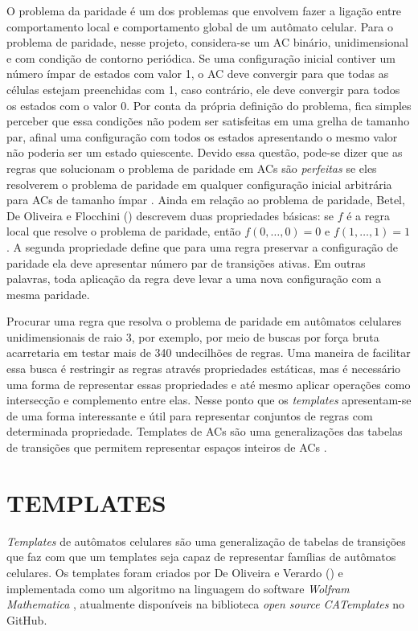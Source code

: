 \documentclass[12pt,a4paper]{article}
\let\stdsection\section
\renewcommand\section{\newpage\stdsection}
\begin{document}
O problema da paridade é um dos problemas que envolvem fazer a ligação entre comportamento local e comportamento global de um autômato celular. Para o problema de paridade, nesse projeto, considera-se um AC binário, unidimensional e com condição de contorno periódica. Se uma configuração inicial contiver um número ímpar de estados com valor 1, o AC deve convergir para que todas as células estejam preenchidas com 1, caso contrário, ele deve convergir para todos os estados com o valor 0. Por conta da própria definição do problema, fica simples perceber que essa condições não podem ser satisfeitas em uma grelha de tamanho par, afinal uma configuração com todos os estados apresentando o mesmo valor não poderia ser um estado quiescente. Devido essa questão, pode-se dizer que as regras que solucionam o problema de paridade em ACs são \textit{perfeitas} se eles resolverem o problema de paridade em qualquer configuração inicial arbitrária para ACs de tamanho ímpar \cite{Betel2013}. Ainda em relação ao problema de paridade, Betel, De Oliveira e Flocchini (\citeyear{Betel2013}) descrevem duas propriedades básicas: se $f$ é a regra local que resolve o problema de paridade, então $f(0, \dots, 0) = 0$ e $f(1, \dots, 1) = 1$. A segunda propriedade define que para uma regra preservar a configuração de paridade ela deve apresentar número par de transições ativas. Em outras palavras, toda aplicação da regra deve levar a uma nova configuração com a mesma paridade.

Procurar uma regra que resolva o problema de paridade em autômatos celulares unidimensionais de raio 3, por exemplo, por meio de buscas por força bruta acarretaria em testar mais de 340 undecilhões de regras. Uma maneira de facilitar essa busca é restringir as regras através propriedades estáticas, mas é necessário uma forma de representar essas propriedades e até mesmo aplicar operações como intersecção e complemento entre elas. Nesse ponto que os \textit{templates} apresentam-se de uma forma interessante e útil para representar conjuntos de regras com determinada propriedade. Templates de ACs são uma generalizações das tabelas de transições que permitem representar espaços inteiros de ACs \cite{Verardo2014}.








\section{TEMPLATES}\label{sec:templates}
\textit{Templates} de autômatos celulares são uma generalização de tabelas de transições que faz com que um templates seja capaz de representar famílias de autômatos celulares. Os templates foram criados por De Oliveira e Verardo (\citeyear{deOliveira2014}) e implementada como um algoritmo na linguagem do software \textit{Wolfram Mathematica} \cite{woframMathematica10}, atualmente disponíveis na biblioteca \textit{open source CATemplates} \cite{CATemplates} no GitHub.
\end{document}
